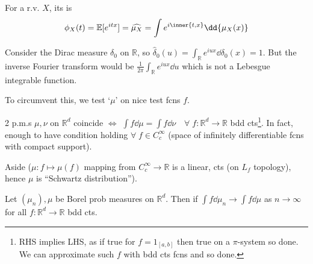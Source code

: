 \begin{definition}
	For a r.v. $X$, its  is
	\begin{align*}
		\phi_X(t) = \mathbb{E}[e^{itx}] = \widehat{\mu_X} = \int e^{i \inner{t, x}} \dd{\mu_X(x)}
	\end{align*}
\end{definition}

\begin{example}
	Consider the Dirac measure $\delta_0$ on $\mathbb R$, so $\hat \delta_0(u) = \int_{\mathbb R} e^{iux} \dd{\delta_0(x)} = 1$.
	But the inverse Fourier transform would be $\frac{1}{2\pi} \int_{\mathbb R} e^{iux} \dd{u}$ which is not a Lebesgue integrable function.
\end{example}

To circumvent this, we test `$\mu$' on nice test fcns $f$.

\begin{remark}
	2 p.m.s $\mu, \nu$ on $\mathbb{R}^d$ coincide $\iff$ $\int f \dd{\mu} = \int f \dd{\nu} \quad \forall \; f : \mathbb{R}^d \to \mathbb{R}$ bdd cts\footnote{RHS implies LHS, as if true for $f = 1_{[a, b]}$ then true on a $\pi$-system so done. We can approximate such $f$ with bdd cts fcns and so done.}.
	In fact, enough to have condition holding $\forall \; f \in C_c^\infty$ (space of infinitely differentiable fcns with compact support).
\end{remark}

\begin{aside}{Aside}
	($\mu : f \mapsto \mu(f)$ mapping from $C_c^\infty \to \mathbb{R}$ is a linear, cts (on $L_f$ topology), hence $\mu$ is ``Schwartz distribution'').

\end{aside}

\begin{definition}
	Let $(\mu_n), \mu$ be Borel prob measures on $\mathbb{R}^d$.
	Then  if $\int f \dd{\mu_n} \to \int f \dd{\mu}$ as $n \to \infty$ for all $f : \mathbb{R}^d \to \mathbb{R}$ bdd cts.
\end{definition}

